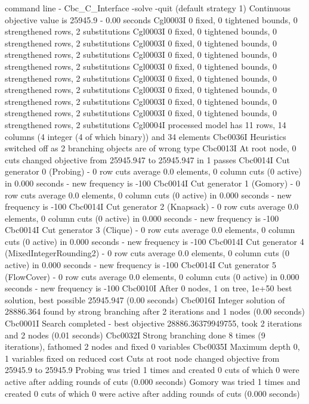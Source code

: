 \documentclass[12pt,a4paper]{article}
\begin{document}
command line - Cbc_C_Interface -solve -quit (default strategy 1)
Continuous objective value is 25945.9 - 0.00 seconds
Cgl0003I 0 fixed, 0 tightened bounds, 0 strengthened rows, 2 substitutions
Cgl0003I 0 fixed, 0 tightened bounds, 0 strengthened rows, 2 substitutions
Cgl0003I 0 fixed, 0 tightened bounds, 0 strengthened rows, 2 substitutions
Cgl0003I 0 fixed, 0 tightened bounds, 0 strengthened rows, 2 substitutions
Cgl0003I 0 fixed, 0 tightened bounds, 0 strengthened rows, 2 substitutions
Cgl0003I 0 fixed, 0 tightened bounds, 0 strengthened rows, 2 substitutions
Cgl0003I 0 fixed, 0 tightened bounds, 0 strengthened rows, 2 substitutions
Cgl0003I 0 fixed, 0 tightened bounds, 0 strengthened rows, 2 substitutions
Cgl0003I 0 fixed, 0 tightened bounds, 0 strengthened rows, 2 substitutions
Cgl0004I processed model has 11 rows, 14 columns (4 integer (4 of which binary)) and 34 elements
Cbc0036I Heuristics switched off as 2 branching objects are of wrong type
Cbc0013I At root node, 0 cuts changed objective from 25945.947 to 25945.947 in 1 passes
Cbc0014I Cut generator 0 (Probing) - 0 row cuts average 0.0 elements, 0 column cuts (0 active)  in 0.000 seconds - new frequency is -100
Cbc0014I Cut generator 1 (Gomory) - 0 row cuts average 0.0 elements, 0 column cuts (0 active)  in 0.000 seconds - new frequency is -100
Cbc0014I Cut generator 2 (Knapsack) - 0 row cuts average 0.0 elements, 0 column cuts (0 active)  in 0.000 seconds - new frequency is -100
Cbc0014I Cut generator 3 (Clique) - 0 row cuts average 0.0 elements, 0 column cuts (0 active)  in 0.000 seconds - new frequency is -100
Cbc0014I Cut generator 4 (MixedIntegerRounding2) - 0 row cuts average 0.0 elements, 0 column cuts (0 active)  in 0.000 seconds - new frequency is -100
Cbc0014I Cut generator 5 (FlowCover) - 0 row cuts average 0.0 elements, 0 column cuts (0 active)  in 0.000 seconds - new frequency is -100
Cbc0010I After 0 nodes, 1 on tree, 1e+50 best solution, best possible 25945.947 (0.00 seconds)
Cbc0016I Integer solution of 28886.364 found by strong branching after 2 iterations and 1 nodes (0.00 seconds)
Cbc0001I Search completed - best objective 28886.36379949755, took 2 iterations and 2 nodes (0.01 seconds)
Cbc0032I Strong branching done 8 times (9 iterations), fathomed 2 nodes and fixed 0 variables
Cbc0035I Maximum depth 0, 1 variables fixed on reduced cost
Cuts at root node changed objective from 25945.9 to 25945.9
Probing was tried 1 times and created 0 cuts of which 0 were active after adding rounds of cuts (0.000 seconds)
Gomory was tried 1 times and created 0 cuts of which 0 were active after adding rounds of cuts (0.000 seconds)
\end{document}
